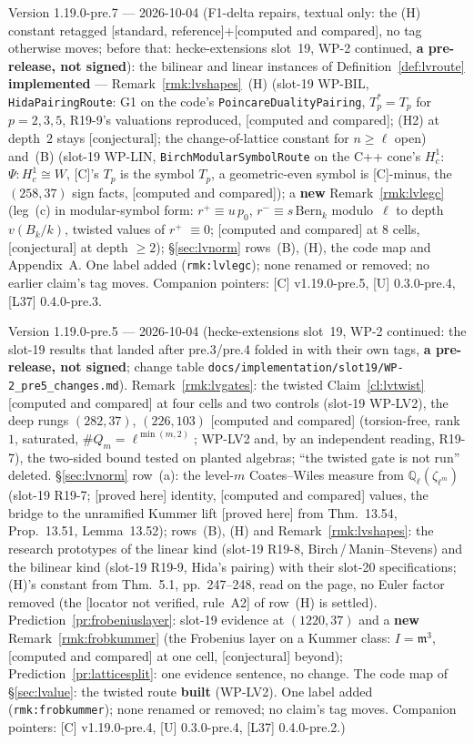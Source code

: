 \documentclass[11pt]{article}
\theoremstyle{remark}
\newcommand{\Q}{\mathbb{Q}}
\newcommand{\m}{\mathfrak{m}}
\newcommand{\PROVED}{\textsf{[proved here]}}
\newcommand{\STD}{\textsf{[standard, reference]}}
\newcommand{\CONJ}{\textsf{[conjectural]}}
\newcommand{\CMPD}{\textsf{[computed and compared]}}   %
\newcommand{\VERIFYloc}{\textsf{[locator not verified, rule~A2]}} %
\begin{document}
Version 1.19.0-pre.7 --- 2026-10-04 (F1-delta repairs, textual only: the (H) constant retagged \STD+\CMPD, no tag otherwise moves; before that: hecke-extensions slot~19, WP-2 continued, \textbf{a pre-release, not signed}): the \textsf{bilinear} and \textsf{linear} instances of
Definition~\ref{def:lvroute} \textbf{implemented} --- Remark~\ref{rmk:lvshapes}~(H) (slot-19 WP-BIL, \texttt{HidaPairingRoute}: G1 on the code's \texttt{PoincareDualityPairing}, $T_p^{\ast}=T_p$
for $p=2,3,5$, R19-9's valuations reproduced, \CMPD; (H2) at depth~$2$ stays \CONJ; the change-of-lattice constant for $n\ge\ell$ open) and~(B) (slot-19 WP-LIN,
\texttt{BirchModularSymbolRoute} on the C++ cone's $H^{1}_c$: $\Psi\colon H^{1}_c\cong W$, [C]'s $T_p$ is the symbol $T_p$, a geometric-even symbol is [C]-minus, the $(258,37)$ sign facts,
\CMPD); a \textbf{new} Remark~\ref{rmk:lvlegc} (leg~(c) in modular-symbol form: $r^{+}\equiv u\,p_0$, $r^{-}\equiv s\,\mathrm{Bern}_k$ modulo~$\ell$ to depth $v(B_k/k)$, twisted values of
$r^{+}$ $\equiv0$; \CMPD{} at $8$ cells, \CONJ{} at depth $\ge2$); \S\ref{sec:lvnorm} rows~(B), (H), the code map and Appendix~A. One label added (\texttt{rmk:lvlegc}); none renamed
or removed; no earlier claim's tag moves. Companion pointers: [C] v1.19.0-pre.5, [U] 0.3.0-pre.4, [L37] 0.4.0-pre.3.

Version 1.19.0-pre.5 --- 2026-10-04 (hecke-extensions slot~19, WP-2 continued: the slot-19 results that landed after pre.3/pre.4 folded in with their own tags, \textbf{a pre-release, not signed};
change table \texttt{docs/implementation/slot19/WP-2\_pre5\_changes.md}). Remark~\ref{rmk:lvgates}: the twisted Claim~\ref{cl:lvtwist} \CMPD{} at four cells and two controls (slot-19 WP-LV2),
the deep rungs $(282,37)$, $(226,103)$ \CMPD{} (torsion-free, rank~$1$, saturated, $\#Q_m=\ell^{\min(m,2)}$; WP-LV2 and, by an independent reading, R19-7), the two-sided bound
tested on planted algebras; ``the twisted gate is not run'' deleted. \S\ref{sec:lvnorm} row~(a): the level-$m$ Coates--Wiles measure from $\Q_\ell(\zeta_{\ell^{m}})$ (slot-19 R19-7;
\PROVED{} identity, \CMPD{} values, the bridge to the unramified Kummer lift \PROVED{} from \cite{washington1st} Thm.~13.54, Prop.~13.51, Lemma~13.52); rows~(B), (H) and
Remark~\ref{rmk:lvshapes}: the research prototypes of the \textsf{linear} kind (slot-19 R19-8, Birch\,/\,Manin--Stevens) and the \textsf{bilinear} kind (slot-19 R19-9, Hida's
pairing) with their slot-20 specifications; (H)'s constant from \cite{hida_cong} Thm.~5.1, pp.~247--248, read on the page, no Euler factor removed (the \VERIFYloc{} of row~(H) is
settled). Prediction~\ref{pr:frobeniuslayer}: slot-19 evidence at $(1220,37)$ and a \textbf{new} Remark~\ref{rmk:frobkummer} (the Frobenius layer on a Kummer class: $I=\m^{3}$,
\CMPD{} at one cell, \CONJ{} beyond); Prediction~\ref{pr:latticesplit}: one evidence sentence, no change. The code map of \S\ref{sec:lvalue}: the twisted route \textbf{built}
(WP-LV2). One label added (\texttt{rmk:frobkummer}); none renamed or removed; no claim's tag moves. Companion pointers: [C] v1.19.0-pre.4, [U] 0.3.0-pre.4, [L37] 0.4.0-pre.2.)
\end{document}
